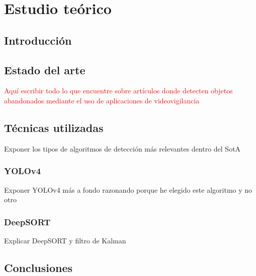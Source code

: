 
\chapter{Estudio teórico}
\label{cha:estudio-teorico}

\section{Introducción}
\label{sec:intro-sota}

\section{Estado del arte}
\label{sec:sota}

\textcolor{red}{Aquí escribir todo lo que encuentre sobre artículos donde detecten objetos abandonados mediante el uso de aplicaciones de videovigilancia}

\section{Técnicas utilizadas}
\label{sec:tecnicas-utilizadas}

Exponer los tipos de algoritmos de detección más relevantes dentro del SotA

\subsection{YOLOv4}
\label{sec:tecnicas-utilizadas1}

Exponer YOLOv4 más a fondo razonando porque he elegido este algoritmo y no otro

\subsection{DeepSORT}
\label{sec:tecnicas-utilizadas2}

Explicar DeepSORT y filtro de Kalman

\section{Conclusiones}
\label{sec:conclu-sota}